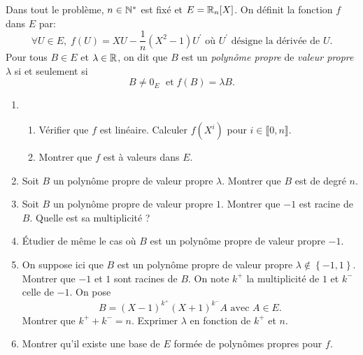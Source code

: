 \noindent
Dans tout le problème, $n \in  \mathbb{N}^*$ est fixé et $E = \mathbb{R}_n[X]$.\newline
On définit la fonction $f$ dans $E$ par:
\[
\forall U \in E, \; f(U) = XU - \frac{1}{n}(X^2-1)U^\prime \text{ où } U^\prime \text{ désigne la dérivée de } U.
\]
Pour tous $B\in E$ et $\lambda \in \mathbb{R}$, on dit que $B$ est un \emph{polynôme propre} de \emph{valeur propre} $\lambda$ si et seulement si
\[
B \neq 0_E\; \text{ et} \; f(B)=\lambda B.
\]
\begin{enumerate}
\item \begin{enumerate}
\item Vérifier que $f$ est linéaire. Calculer $f(X^i)$ pour $i\in \llbracket 0,n \rrbracket$.
\item Montrer que  $f$ est à valeurs dans $E$.
\end{enumerate}
\item Soit $B$ un polynôme propre de valeur propre $\lambda$. Montrer que $B$ est de degré $n$.
\item Soit $B$ un polynôme propre de valeur propre $1$. Montrer que $-1$ est racine de $B$. Quelle est sa multiplicité ?
\item \'Etudier de même le cas où $B$ est un polynôme propre de valeur propre $-1$.
\item On suppose ici que $B$ est un polynôme propre de valeur propre $\lambda \notin \left\lbrace -1,1 \right\rbrace$. Montrer que $-1$ et $1$ sont racines de $B$. On note $k^+$ la multiplicité de $1$ et $k^-$ celle de $-1$.\newline
On pose
\[
B=(X-1)^{k^+}(X+1)^{k^-}A \text{ avec } A\in E.
\]
 Montrer que $k^+ + k^- = n$. Exprimer $\lambda$ en fonction de $k^+$ et $n$.
\item Montrer qu'il existe une base de $E$ formée de polynômes propres pour $f$.
\end{enumerate}
